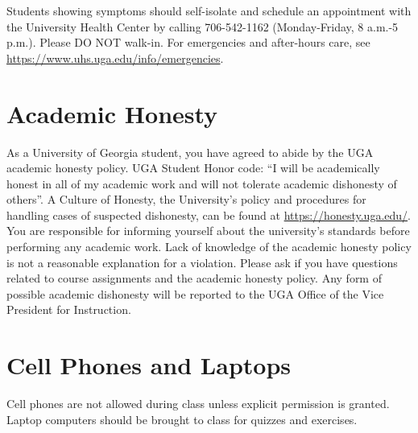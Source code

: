 \documentclass[12pt]{article}
\begin{document}
Students showing symptoms should self-isolate and schedule an
appointment with the University Health Center by calling 706-542-1162
(Monday-Friday, 8 a.m.-5 p.m.). Please DO NOT walk-in. For emergencies
and after-hours care, see
\url{https://www.uhs.uga.edu/info/emergencies}.  


\vspace{-2mm}
\section*{\normalsize Academic Honesty}
\vspace{-4mm}
As a University of Georgia student, you have agreed to abide by the
UGA academic honesty policy. UGA Student Honor code: “I will be
academically honest in all of my academic work and will not tolerate
academic dishonesty of others”. A Culture of Honesty, the University's
policy and procedures for handling cases of suspected dishonesty, can
be found at \url{https://honesty.uga.edu/}. You are responsible for
informing yourself about the university’s standards before performing
any academic work. Lack of knowledge of the academic honesty policy is
not a reasonable explanation for a violation. Please ask if you have
questions related to course assignments and the academic honesty
policy. Any form of possible academic dishonesty will be reported to
the UGA Office of the Vice President for Instruction.

\vspace{-2mm}
\section*{\normalsize Cell Phones and Laptops}
\vspace{-4mm}
Cell phones are not allowed during class unless explicit permission is
granted. Laptop computers should be brought to class for quizzes and
exercises.
\end{document}
